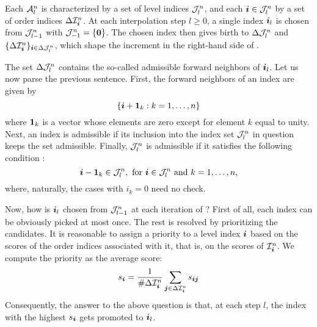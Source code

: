 Each $\mathcal{A}^{n}_{l}$ is characterized by a set of level indices
$\mathcal{J}^{n}_{l}$, and each $\boldsymbol{i} \in \mathcal{J}^{n}_{l}$ by a set of order
indices $\Delta\mathcal{I}^{n}_{\boldsymbol{i}}$. At each interpolation step $l \geq 0$, a
single index $\boldsymbol{i}_l$ is chosen from $\mathcal{J}^{n}_{l - 1}$ with
$\mathcal{J}^{n}_{-1} = \{ \boldsymbol{0} \}$. The chosen index then gives birth to
$\Delta\mathcal{J}^{n}_{l}$ and $\{ \Delta\mathcal{I}^{n}_{\boldsymbol{i}} \}_{\boldsymbol{i} \in
\Delta\mathcal{J}^{n}_{l}}$, which shape the increment in the right-hand side of
.

The set $\Delta\mathcal{J}^{n}_{l}$ contains the so-called admissible forward
neighbors of $\boldsymbol{i}_l$. Let us now parse the previous sentence. First, the forward
neighbors of an index \vi are given by
\[
  \left\{ \boldsymbol{i} + \boldsymbol{1}_k: k = 1, \dots, n \right\}
\]
where $\boldsymbol{1}_k$ is a vector whose elements are zero except for element $k$ equal
to unity. Next, an index \vi is admissible if its inclusion into the index set
$\mathcal{J}^{n}_{l}$ in question keeps the set admissible. Finally,
$\mathcal{J}^{n}_{l}$ is admissible if it satisfies the following condition
\cite{klimke2006}:
\[
  \boldsymbol{i} - \boldsymbol{1}_k \in \mathcal{J}^{n}_{l}, \text{ for $\boldsymbol{i} \in \mathcal{J}^{n}_{l}$ and $k = 1, \dots, n$,}
\]
where, naturally, the cases with $i_k = 0$ need no check.

Now, how is $\boldsymbol{i}_l$ chosen from $\mathcal{J}^{n}_{l - 1}$ at each iteration of
? First of all, each index can be obviously picked at most
once. The rest is resolved by prioritizing the candidates. It is reasonable to
assign a priority to a level index $\boldsymbol{i}$ based on the scores of the order
indices associated with it, that is, on the scores of $\mathcal{I}^{n}_{\boldsymbol{i}}$. We
compute the priority as the average score:
\[
  s_{\boldsymbol{i}} = \frac{1}{\# \Delta\mathcal{I}^{n}_{\boldsymbol{i}}} \sum_{\boldsymbol{j} \in \Delta\mathcal{I}^{n}_{\boldsymbol{i}}} s_{\boldsymbol{i} \boldsymbol{j}}
\]
Consequently, the answer to the above question is that, at each step $l$, the
index \vi with the highest $s_{\boldsymbol{i}}$ gets promoted to $\boldsymbol{i}_l$.

